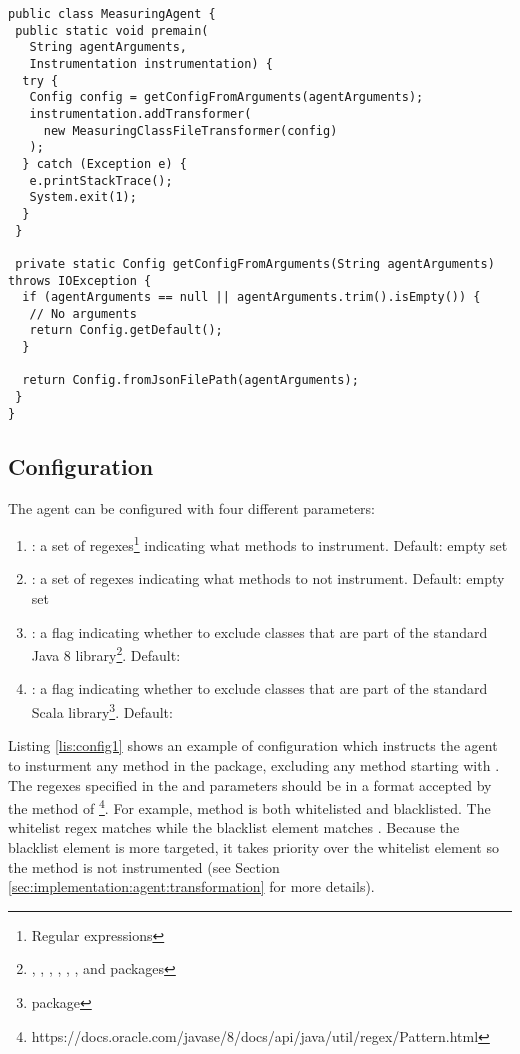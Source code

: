 \begin{lstlisting}[breaklines,caption={$MeasuringAgent$ class},label=lis:measuringagent]
public class MeasuringAgent {
 public static void premain(
   String agentArguments,
   Instrumentation instrumentation) {
  try {
   Config config = getConfigFromArguments(agentArguments);
   instrumentation.addTransformer(
     new MeasuringClassFileTransformer(config)
   );
  } catch (Exception e) {
   e.printStackTrace();
   System.exit(1);
  }
 }

 private static Config getConfigFromArguments(String agentArguments) throws IOException {
  if (agentArguments == null || agentArguments.trim().isEmpty()) {
   // No arguments
   return Config.getDefault();
  }

  return Config.fromJsonFilePath(agentArguments);
 }
}
\end{lstlisting}

\subsection{Configuration}
\label{sec:implementation:agent:configuration}
The agent can be configured with four different parameters:
\begin{enumerate}
  \item \textbf{}: a set of regexes\footnote{Regular expressions} indicating what methods to instrument. Default: empty set
  \item \textbf{}: a set of regexes indicating what methods to not instrument. Default: empty set
  \item \textbf{}: a flag indicating whether to exclude classes that are part of the standard Java 8 library\footnote{, , , , , ,  and  packages}. Default: 
  \item \textbf{}:  a flag indicating whether to exclude classes that are part of the standard Scala library\footnote{ package}. Default: 
\end{enumerate}

\noindent Listing \ref{lis:config1} shows an example of configuration which instructs the agent to insturment any method in the  package, excluding any method starting with . The regexes specified in the  and  parameters should be in a format accepted by the  method of \footnote{https://docs.oracle.com/javase/8/docs/api/java/util/regex/Pattern.html}. For example, method  is both whitelisted and blacklisted. The whitelist regex matches  while the blacklist element matches . Because the blacklist element is more targeted, it takes priority over the whitelist element so the method is not instrumented (see Section \ref{sec:implementation:agent:transformation} for more details).

